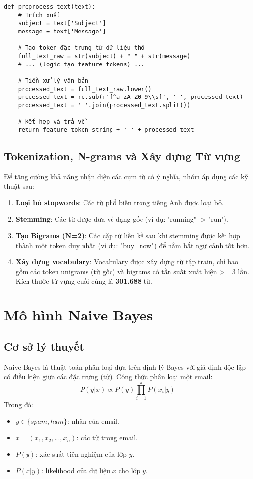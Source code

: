 \begin{verbatim}
def preprocess_text(text):
    # Trích xuất
    subject = text['Subject']
    message = text['Message']
    
    # Tạo token đặc trưng từ dữ liệu thô
    full_text_raw = str(subject) + " " + str(message)
    # ... (logic tạo feature tokens) ...
    
    # Tiền xử lý văn bản
    processed_text = full_text_raw.lower()
    processed_text = re.sub(r'[^a-zA-Z0-9\\s]', ' ', processed_text)
    processed_text = ' '.join(processed_text.split())
    
    # Kết hợp và trả về
    return feature_token_string + ' ' + processed_text
\end{verbatim}

\subsection{Tokenization, N-grams và Xây dựng Từ vựng}
Để tăng cường khả năng nhận diện các cụm từ có ý nghĩa, nhóm áp dụng các kỹ thuật sau:
\begin{enumerate}
    \item \textbf{Loại bỏ stopwords}: Các từ phổ biến trong tiếng Anh được loại bỏ.
    \item \textbf{Stemming}: Các từ được đưa về dạng gốc (ví dụ: "running" -> "run").
    \item \textbf{Tạo Bigrams (N=2)}: Các cặp từ liền kề sau khi stemming được kết hợp thành một token duy nhất (ví dụ: "buy\_now") để nắm bắt ngữ cảnh tốt hơn.
    \item \textbf{Xây dựng vocabulary}: Vocabulary được xây dựng từ tập train, chỉ bao gồm các token  unigrams (từ gốc) và bigrams có tần suất xuất hiện >= 3 lần. Kích thước từ vựng cuối cùng là \textbf{301.688} từ.
\end{enumerate}

\section{Mô hình Naive Bayes}

\subsection{Cơ sở lý thuyết}
Naive Bayes là thuật toán phân loại dựa trên định lý Bayes với giả định độc lập có điều kiện giữa các đặc trưng (từ). Công thức phân loại một email:
$$P(y|x) \propto P(y) \prod_{i=1}^{n} P(x_i|y)$$
Trong đó:
\begin{itemize}
    \item $y \in \{spam, ham\}$: nhãn của email.
    \item $x = (x_1, x_2, ..., x_n)$: các từ trong email.
    \item $P(y)$: xác suất tiên nghiệm của lớp $y$.
    \item $P(x|y)$: likelihood của dữ liệu $x$ cho lớp $y$.
\end{itemize}


